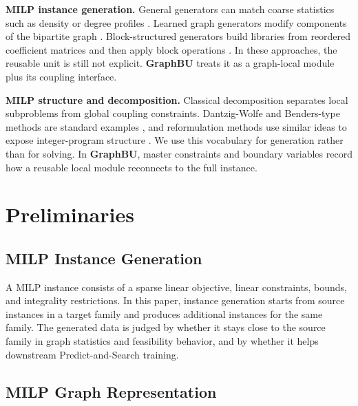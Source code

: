 \documentclass[letterpaper]{article}
\newcommand{\method}{\textbf{GraphBU}\xspace}
\begin{document}
\textbf{MILP instance generation.}
General generators can match coarse statistics such as density or degree profiles \cite{bowly2019stress}. Learned graph generators modify components of the bipartite graph \cite{geng2023g2milp}. Block-structured generators build libraries from reordered coefficient matrices and then apply block operations \cite{liu2024milpstudio}. In these approaches, the reusable unit is still not explicit. \method treats it as a graph-local module plus its coupling interface.

\textbf{MILP structure and decomposition.}
Classical decomposition separates local subproblems from global coupling constraints. Dantzig-Wolfe and Benders-type methods are standard examples \cite{dantzig1960decomposition,benders1962partitioning,geoffrion1972generalized}, and reformulation methods use similar ideas to expose integer-program structure \cite{vanderbeck2010reformulation}. We use this vocabulary for generation rather than for solving. In \method, master constraints and boundary variables record how a reusable local module reconnects to the full instance.

\section{Preliminaries}

\subsection{MILP Instance Generation}

A MILP instance consists of a sparse linear objective, linear constraints, bounds, and integrality restrictions. In this paper, instance generation starts from source instances in a target family and produces additional instances for the same family. The generated data is judged by whether it stays close to the source family in graph statistics and feasibility behavior, and by whether it helps downstream Predict-and-Search training.

\subsection{MILP Graph Representation}
\end{document}
